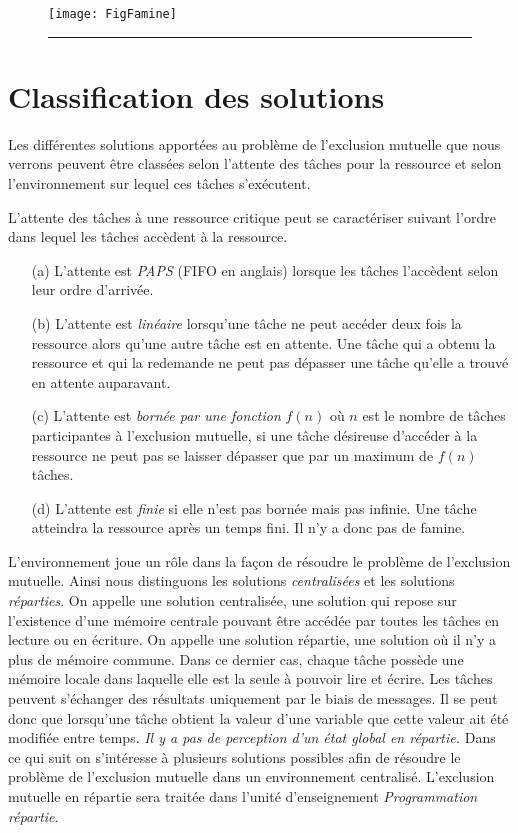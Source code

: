 \begin{figure}[tb]
\begin{center}
\texttt{[image: FigFamine]}
\end{center}
\vspace{-.2cm}
\rule{\textwidth}{0.01in}
\end{figure}

\section{Classification des solutions}
Les différentes solutions apportées au problème de l'exclusion mutuelle que nous verrons peuvent être classées selon l'attente des tâches pour la ressource et selon l'environnement sur lequel ces tâches s'exécutent.
\par
L'attente des tâches à une ressource critique peut se caractériser suivant l'ordre dans lequel les tâches accèdent à la ressource.
\begin{itemize}
\item[(a)] L'attente est {\em PAPS} (FIFO en anglais) lorsque les tâches l'accèdent selon leur ordre d'arrivée.
\item[(b)] L'attente est {\em linéaire} lorsqu'une tâche ne peut accéder deux fois la ressource alors qu'une autre tâche est en attente.
Une tâche qui a obtenu la ressource et qui la redemande ne peut pas dépasser une tâche qu'elle a trouvé en attente auparavant.
\item[(c)] L'attente est {\em bornée par une fonction} $f(n)$ où $n$ est le nombre de tâches participantes à l'exclusion mutuelle, si une tâche désireuse d'accéder à la ressource ne peut pas se laisser dépasser que par un maximum de $f(n)$ tâches.
\item[(d)] L'attente est {\em finie} si elle n'est pas bornée mais pas infinie. Une tâche atteindra la ressource après un temps fini.  Il n'y a donc pas de famine.
\end{itemize}
\par
L'environnement joue un rôle dans la façon de résoudre le problème de l'exclusion mutuelle.  Ainsi nous distinguons les solutions {\em centralisées} et les solutions {\em réparties}. On appelle une solution centralisée, une solution qui repose sur l'existence d'une mémoire centrale pouvant être accédée par toutes les tâches en lecture ou en écriture. On appelle une solution répartie, une solution où il n'y a plus de mémoire commune.
Dans ce dernier cas, chaque tâche possède une mémoire locale dans laquelle elle est la seule à pouvoir lire et écrire. Les tâches peuvent s'échanger des résultats uniquement par le biais de messages. Il se peut donc que lorsqu'une tâche obtient la valeur d'une variable que cette valeur ait été modifiée entre temps. {\em Il y a pas de perception d'un état global en répartie.}
Dans ce qui suit on s'intéresse à plusieurs solutions possibles afin de résoudre le problème de l'exclusion mutuelle dans un environnement centralisé. L'exclusion mutuelle en répartie sera traitée dans l'unité d'enseignement {\em Programmation répartie.}


